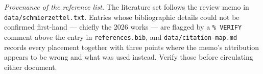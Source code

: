 \documentclass[11pt,a4paper]{article}
\newcommand{\code}[1]{\texttt{\small #1}}
\begin{document}
\clearpage
\noindent\small\emph{Provenance of the reference list.} The literature set follows the review
memo in \code{data/schmierzettel.txt}. Entries whose bibliographic details could not be
confirmed first-hand --- chiefly the 2026 works --- are flagged by a \code{\% VERIFY} comment
above the entry in \code{references.bib}, and \code{data/citation-map.md} records every
placement together with three points where the memo's attribution appears to be wrong and what
was used instead. Verify those before circulating either document.\normalsize
\smallskip



\end{document}
